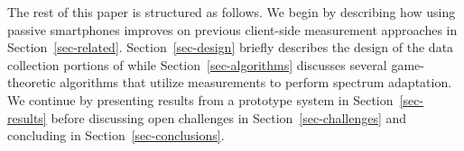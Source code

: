 The rest of this paper is structured as follows. We begin by describing how
using passive smartphones improves on previous client-side measurement
approaches in Section~\ref{sec-related}. Section~\ref{sec-design} briefly
describes the design of the data collection portions of \PS{} while
Section~\ref{sec-algorithms} discusses several game-theoretic algorithms that
utilize \PS{} measurements to perform spectrum adaptation. We continue by
presenting results from a prototype \PS{} system in Section~\ref{sec-results}
before discussing open challenges in Section~\ref{sec-challenges} and
concluding in Section~\ref{sec-conclusions}.
